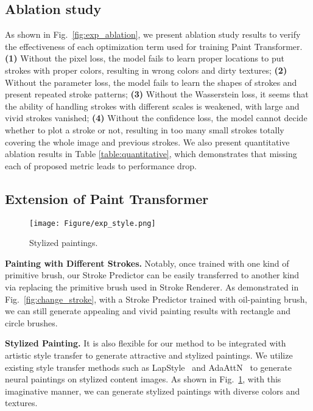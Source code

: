 \documentclass[10pt,twocolumn,letterpaper]{article}
\begin{document}
\subsection{Ablation study}

As shown in Fig.~\ref{fig:exp_ablation}, we present ablation study results to verify the effectiveness of each optimization term used for training Paint Transformer. 
\textbf{(1)} Without the pixel loss, the model fails to learn proper locations to put strokes with proper colors, resulting in wrong colors and dirty textures;
\textbf{(2)} Without the parameter  loss, the model fails to learn the shapes of strokes and present repeated stroke patterns;
\textbf{(3)} Without the Wasserstein loss, it seems that the ability of handling strokes with different scales is weakened, with large and vivid strokes vanished;
\textbf{(4)} Without the confidence loss, the model cannot decide whether to plot a stroke or not, resulting in too many small strokes totally covering the whole image and previous strokes. 
We also present quantitative ablation results in Table \ref{table:quantitative}, which demonstrates that missing each of proposed metric leads to performance drop.

\subsection{Extension of Paint Transformer}

\begin{figure}[t]
\begin{center}
\texttt{[image: Figure/exp\_style.png]}
\end{center}
\vspace{-0.2cm}
   \caption{Stylized paintings.}
\label{fig:exp_style}
\vspace{-0.5cm}
\end{figure}

\noindent
\textbf{Painting with Different Strokes. }
Notably, once trained with one kind of primitive brush, our Stroke Predictor can be easily transferred to another kind via replacing the primitive brush used in Stroke Renderer.
As demonstrated in Fig.~\ref{fig:change_stroke}, with a Stroke Predictor trained with oil-painting brush, we can still generate appealing and vivid painting results with rectangle and circle brushes.

\noindent
\textbf{Stylized Painting. }
It is also flexible for our method to be integrated with artistic style transfer to generate attractive and stylized paintings. 
We utilize existing style transfer methods such as LapStyle~\cite{lin2021drafting} and AdaAttN~\cite{liu2021adaattn} to generate neural paintings on stylized content images.
As shown in Fig.~\ref{fig:exp_style}, with this imaginative manner, we can generate stylized paintings with diverse colors and textures.
\end{document}
